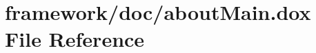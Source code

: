\hypertarget{about_main_8dox}{}\section{framework/doc/about\+Main.dox File Reference}
\label{about_main_8dox}
